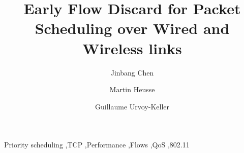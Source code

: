 \documentclass[preprint,12pt]{elsarticle}
\begin{document}
\begin{frontmatter}



\title{Early Flow Discard for Packet Scheduling over Wired and Wireless links}


\author[*]{Jinbang Chen}
\author[**]{Martin Heusse}
\author[***]{Guillaume Urvoy-Keller}
\address[*]{Eurecom, 450 Route des Chappes, 06410 Biot France}
\address[**]{Laboratoire LIG CNRS UMR 5217, Grenoble, France}
\address[***]{Universit\'e de Nice Sophia-Antipolis, Laboratoire I3S CNRS UMR 6070, France}

\begin{abstract}

\end{abstract}

\begin{keyword}
Priority scheduling \sep TCP \sep Performance \sep Flows \sep QoS \sep 802.11


\end{keyword}

\end{frontmatter}


\end{document}

